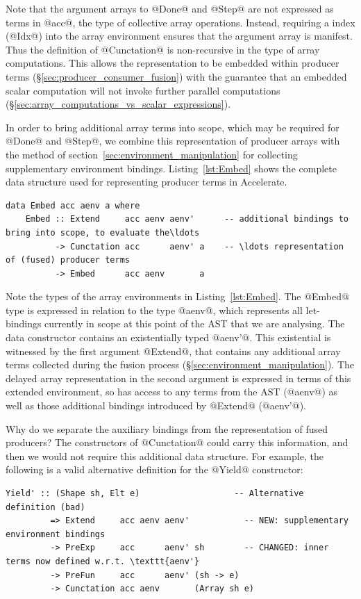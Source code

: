 Note that the argument arrays to @Done@ and @Step@ are not expressed as terms in
@acc@, the type of collective array operations. Instead, requiring a  index (@Idx@) into the array environment ensures that the argument array
is manifest. Thus the definition of @Cunctation@ is non-recursive in the type of
array computations. This allows the representation to be embedded within
producer terms (\S\ref{sec:producer_consumer_fusion}) with the guarantee that an
embedded scalar computation will not invoke further parallel computations
(\S\ref{sec:array_computations_vs_scalar_expressions}).

In order to bring additional array terms into scope, which may be required for
@Done@ and @Step@, we combine this representation of producer arrays with the
method of section~\ref{sec:environment_manipulation} for collecting
supplementary environment bindings. Listing~\ref{lst:Embed} shows the complete
data structure used for representing producer terms in Accelerate.
%
\begin{lstlisting}[style=haskell_float
    ,label=lst:Embed
    ,caption={Representation of fused producer arrays in Accelerate}]
data Embed acc aenv a where
    Embed :: Extend     acc aenv aenv'      -- additional bindings to bring into scope, to evaluate the\ldots
          -> Cunctation acc      aenv' a    -- \ldots representation of (fused) producer terms
          -> Embed      acc aenv       a
\end{lstlisting}

Note the types of the array environments in Listing~\ref{lst:Embed}. The @Embed@
type is expressed in relation to the type @aenv@, which represents all
let-bindings currently in scope at this point of the AST that we are analysing. The data constructor contains an
existentially typed @aenv'@. This existential is witnessed by the first argument
@Extend@, that contains any additional array terms collected during the fusion
process (\S\ref{sec:environment_manipulation}). The delayed array representation
in the second argument is expressed in terms of this extended environment, so
has access to any terms from the AST (@aenv@) as well as those additional
bindings introduced by @Extend@ (@aenv'@).

Why do we separate the auxiliary bindings from the representation of fused
producers? The constructors of @Cunctation@ could carry this information,
and then we would not require this additional data structure. For example, the
following is a valid alternative definition for the @Yield@ constructor:
%
\begin{lstlisting}[style=haskell]
  Yield' :: (Shape sh, Elt e)                   -- Alternative definition (bad)
         => Extend     acc aenv aenv'           -- NEW: supplementary environment bindings
         -> PreExp     acc      aenv' sh        -- CHANGED: inner terms now defined w.r.t. \texttt{aenv'}
         -> PreFun     acc      aenv' (sh -> e)
         -> Cunctation acc aenv       (Array sh e)
\end{lstlisting}

